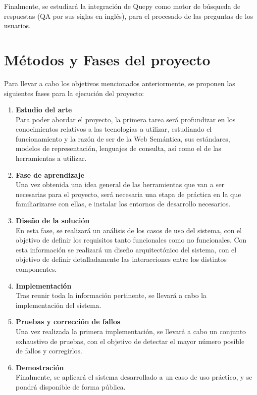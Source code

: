 \documentclass[a4paper,11pt]{report}
\begin{document}
Finalmente, se estudiará la integración de Quepy como motor de búsqueda de respuestas (QA por sus siglas en inglés), para el procesado de las preguntas de los usuarios.

\chapter*{Métodos y Fases del proyecto}\vspace{-1ex}

Para llevar a cabo los objetivos mencionados anteriormente, se proponen las siguientes fases para la ejecución del proyecto:
\begin{enumerate}
  \item \textbf{Estudio del arte } ~\\
  Para poder abordar el proyecto, la primera tarea será profundizar en los conocimientos relativos a las tecnologías a utilizar, estudiando el funcionamiento y la razón de ser de la Web Semántica, sus estándares, modelos de representación, lenguajes de consulta, así como el de las herramientas a utilizar.
  \item \textbf{Fase de aprendizaje} ~\\
  Una vez obtenida una idea general de las herramientas que van a ser necesarias para el proyecto, será necesaria una etapa de práctica en la que familiarizarse con ellas, e instalar los entornos de desarrollo necesarios.
  \item \textbf{Diseño de la solución} ~\\ 
  En esta fase, se realizará un análisis de los casos de uso del sistema, con el objetivo de definir los requisitos tanto funcionales como no funcionales. Con esta información se realizará un diseño arquitectónico del sistema, con el objetivo de definir detalladamente las interacciones entre los distintos componentes.
  \item \textbf{Implementación} ~\\
  Tras reunir toda la información pertinente, se llevará a cabo la implementación del sistema.
  \item \textbf{Pruebas y corrección de fallos} ~\\
  Una vez realizada la primera implementación, se llevará a cabo un conjunto exhaustivo de pruebas, con el objetivo de detectar el mayor número posible de fallos y corregirlos.
  \item \textbf{Demostración } ~\\
  Finalmente, se aplicará el sistema desarrollado a un caso de uso práctico, y se pondrá disponible de forma pública.
\end{enumerate}
\end{document}
